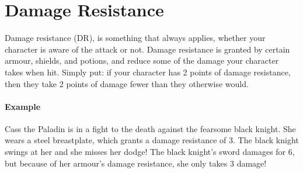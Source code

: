 \section{Damage Resistance}
Damage resistance (DR), is something that always applies, whether your character is aware of the attack or not.
Damage resistance is granted by certain armour, shields, and potions, and reduce some of the damage your character takes when hit.
Simply put: if your character has 2 points of damage resistance, then they take 2 points of damage fewer than they otherwise would.

\paragraph{Example} Cass the Paladin is in a fight to the death against the fearsome black knight.
She wears a steel breastplate, which grants a damage resistance of 3.
The black knight swings at her and she misses her dodge!
The black knight's sword damages for 6, but because of her armour's damage resistance, she only takes 3 damage!
